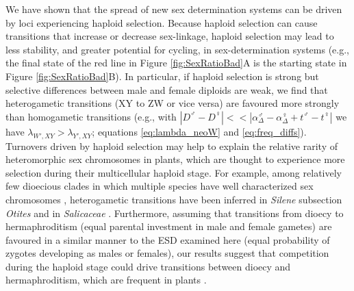 \documentclass[12pt]{article}
\begin{document}
We have shown that the spread of new sex determination systems can be driven by loci experiencing haploid selection. 
Because haploid selection can cause transitions that increase or decrease sex-linkage, haploid selection may lead to less stability, and greater potential for cycling, in sex-determination systems (e.g., the final state of the red line in Figure \ref{fig:SexRatioBad}A is the starting state in Figure \ref{fig:SexRatioBad}B). 
In particular, if haploid selection is strong but selective differences between male and female diploids are weak, we find that heterogametic transitions (XY to ZW or vice versa) are favoured more strongly than homogametic transitions (e.g., with $|D^\male - D^\female| << |\alpha_\Delta^\male - \alpha_\Delta^\female + t^\male - t^\female|$ we have $\lambda_{W',XY} > \lambda_{Y',XY}$; equations \ref{eq:lambda_neoW} and \ref{eq:freq_diffs}). 
Turnovers driven by haploid selection may help to explain the relative rarity of heteromorphic sex chromosomes in plants, which are thought to experience more selection during their multicellular haploid stage.
For example, among relatively few dioecious clades in which multiple species have well characterized sex chromosomes \citep{Ming:2011iy}, heterogametic transitions have been inferred in \textit{Silene} subsection \textit{Otites} \citep{Slancarova:2013dq} and in \textit{Salicaceae} \citep{Pucholt2015,Pucholt2017}.
Furthermore, assuming that transitions from dioecy to hermaphroditism (equal parental investment in male and female gametes) are favoured in a similar manner to the ESD examined here (equal probability of zygotes developing as males or females), our results suggest that competition during the haploid stage could drive transitions between dioecy and hermaphroditism, which are frequent in plants \citep{Kafer2017, Goldberg2017}.
\end{document}
